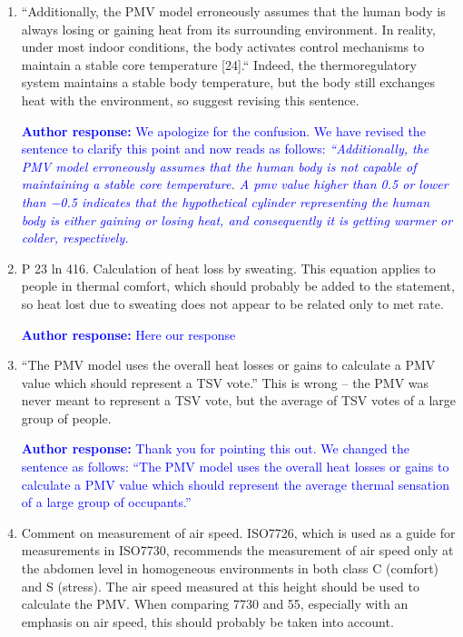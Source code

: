 \documentclass[a4paper, 10pt]{letter}
\newcommand{\response}[1]{\textcolor{blue}{\textbf{Author response:} #1}}
\begin{document}
\begin{letter}
\begin{enumerate}
            \response{Here our response}

            \item ``Additionally, the PMV model erroneously assumes that the human body is always losing or gaining heat from its surrounding environment.
            In reality, under most indoor conditions, the body activates control mechanisms to maintain a stable core temperature [24].``
            Indeed, the thermoregulatory system maintains a stable body temperature, but the body still exchanges heat with the environment, so suggest revising this sentence.

            \response{
                We apologize for the confusion.
                We have revised the sentence to clarify this point and now reads as follows: \textit{``Additionally, the PMV model erroneously assumes that the human body is not capable of maintaining a stable core temperature.
                A \ac{pmv} value higher than \num{.5} or lower than \num{-.5} indicates that the hypothetical cylinder representing the human body is either gaining or losing heat, and consequently it is getting warmer or colder, respectively.
                }
            }

            \item P 23 ln 416.
            Calculation of heat loss by sweating.
            This equation applies to people in thermal comfort, which should probably be added to the statement, so heat lost due to sweating does not appear to be related only to met rate.

            \response{Here our response}

            \item ``The PMV model uses the overall heat losses or gains to calculate a PMV value which should represent a TSV vote.'' This is wrong -- the PMV was never meant to represent a TSV vote, but the average of TSV votes of a large group of people.

            \response{
                Thank you for pointing this out.
                We changed the sentence as follows: ``The PMV model uses the overall heat losses or gains to calculate a PMV value which should represent the average thermal sensation of a large group of occupants.''
            }

            \item Comment on measurement of air speed.
            ISO7726, which is used as a guide for measurements in ISO7730, recommends the measurement of air speed only at the abdomen level in homogeneous environments in both class C (comfort) and S (stress).
            The air speed measured at this height should be used to calculate the PMV\@.
            When comparing 7730 and 55, especially with an emphasis on air speed, this should probably be taken into account.


\end{enumerate}
\end{letter}
\end{document}
